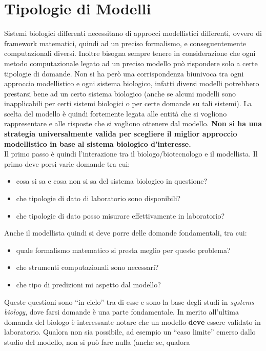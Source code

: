 \documentclass[a4paper,12pt, oneside]{book}
\begin{document}
\section{Tipologie di Modelli}
Sistemi biologici differenti necessitano di approcci modellistici differenti,
ovvero di framework matematici, quindi ad un preciso formalismo, e
conseguentemente computazionali diversi. Inoltre bisogna sempre tenere in
considerazione che ogni metodo computazionale legato ad un preciso modello può
rispondere solo a certe tipologie di domande. Non si ha però una corrispondenza
biunivoca tra ogni approccio modellistico e ogni sistema biologico, infatti
diversi modelli potrebbero prestarsi bene ad un certo sistema biologico (anche
se alcuni modelli sono inapplicabili per certi sistemi biologici o per certe
domande su tali sistemi). La scelta del modello è quindi fortemente legata alle
entità che si vogliono rappresentare e alle risposte che si vogliono ottenere
dal modello. \textbf{Non si ha una strategia universalmente valida per scegliere
il miglior approccio modellistico in base al sistema biologico d'interesse.}\\
Il primo passo è quindi l'interazione tra il biologo/biotecnologo e il
modellista. Il primo deve porsi varie domande tra cui:
\begin{itemize}
  \item cosa si sa e cosa non si sa del sistema biologico in questione?
  \item che tipologie di dato di laboratorio sono disponibili?
  \item che tipologie di dato posso misurare effettivamente in laboratorio? 
\end{itemize}
Anche il modellista quindi si deve porre delle domande fondamentali, tra cui:
\begin{itemize}
  \item quale formalismo matematico si presta meglio per questo problema?
  \item che strumenti computazionali sono necessari?
  \item che tipo di predizioni mi aspetto dal modello?
\end{itemize}
Queste questioni sono ``in ciclo'' tra di esse e sono la base degli studi in
\textit{systems biology}, dove farsi domande è una parte fondamentale. In merito
all'ultima domanda del biologo è 
interessante notare che un modello \textbf{deve} essere validato in
laboratorio. Qualora non sia possibile, ad esempio un ``caso limite'' emerso
dallo studio del modello, non si può fare nulla (anche se, qualora
\end{document}
